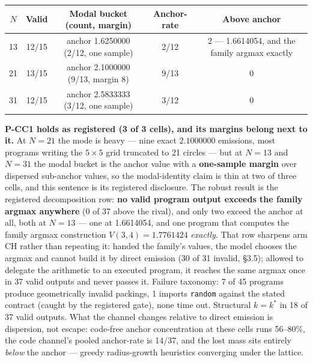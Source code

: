 \begin{center}
\begin{small}
\setlength{\tabcolsep}{4pt}
\begin{tabular}{@{}ccccc@{}}
\toprule
$N$ & Valid & Modal bucket (count, margin) & Anchor-rate & Above anchor \\
\midrule
13 & 12/15 & anchor 1.6250000 (2/12, one sample) & 2/12 & 2 --- 1.6614054, and the family argmax exactly \\
21 & 13/15 & anchor 2.1000000 (9/13, margin 8) & 9/13 & 0 \\
31 & 12/15 & anchor 2.5833333 (3/12, one sample) & 3/12 & 0 \\
\bottomrule
\end{tabular}
\end{small}
\end{center}

\textbf{P-CC1 holds as registered (3 of 3 cells), and its margins belong next to it.} At
$N = 21$ the mode is heavy --- nine exact $2.1000000$ emissions, most programs writing the
$5 \times 5$ grid truncated to 21 circles --- but at $N = 13$ and $N = 31$ the modal bucket is
the anchor value with a \textbf{one-sample margin} over dispersed sub-anchor values, so the
modal-identity claim is thin at two of three cells, and this sentence is its registered
disclosure. The robust result is the registered decomposition row: \textbf{no valid program
output exceeds the family argmax anywhere} (0 of 37 above the rival), and only two exceed
the anchor at all, both at $N = 13$ --- one at 1.6614054, and one program that computes the family argmax construction
$V(3, 4) = 1.7761424$ \emph{exactly}. That row sharpens arm CH rather than repeating it: handed
the family's values, the model chooses the argmax and cannot build it by direct emission (30 of
31 invalid, \S3.5); allowed to delegate the arithmetic to an executed program, it reaches the
same argmax once in 37 valid outputs and never passes it. Failure taxonomy: 7 of 45 programs
produce geometrically invalid packings, 1 imports \texttt{random} against the stated contract
(caught by the registered gate), none time out. Structural $k = k^*$ in 18 of 37 valid outputs.
What the channel changes relative to direct emission is dispersion, not escape: code-free
anchor concentration at these cells runs 56--80\%, the code channel's pooled anchor-rate is
14/37, and the lost mass sits entirely \emph{below} the anchor --- greedy radius-growth
heuristics converging under the lattice.

